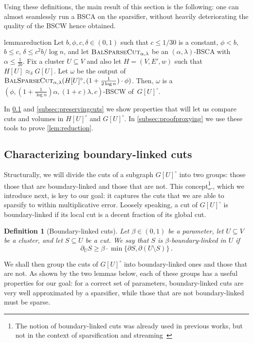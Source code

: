 \documentclass[epsfig,letter,11pt]{article}
\numberwithin{equation}{section}
\newcommand{\uncut}[2]{{\partial}_{#2} #1}
\newcommand{\uncutg}[1]{{\partial} #1}
\newcommand{\bsc}{\textsc{BalSparseCut}_{\alpha,\lambda}}
\newtheorem{definition}[theorem]{Definition}
\begin{document}
Using these definitions, the main result of this section is the following: one can almost seamlessly run a BSCA on the sparsifier, without heavily deteriorating the quality of the BSCW hence obtained.
\begin{restatable}{lemma}{reduction}
	\label{lem:reduction}
	Let $b, \phi, c,\delta \in (0,1)$ such that $c \leq 1/30$ is a constant, $\phi < b$, $b \le c$, $\delta \le c^2b/ \log n$, and  let $\bsc$ be an $(\alpha,\lambda)$-BSCA with $ \alpha \le \frac{1}{2b}$. Fix a cluster $U \subseteq V$ and also let $H=(V,E',w)$ such that $H[U] \approx_\delta G[U]$. Let $\omega$ be the output of $\bsc(H[U]^\circ, (1+\frac{1}{2\log n}) \cdot \phi)$. Then, $\omega$ is a  $(\phi,(1+\frac{1}{\log n})\alpha,(1+c)\lambda,c)$-BSCW of~$G[U]^\circ$.
\end{restatable}
\noindent
In \cref{subsec:boundlink} and \cref{subsec:preservingcuts}  we show properties that will let us compare cuts and volumes in $H[U]^\circ$ and $G[U]^\circ$. In \cref{subsec:proofproxying} we use these tools to prove \cref{lem:reduction}.

\subsection{Characterizing boundary-linked cuts}
\label{subsec:boundlink}
Structurally, we will divide the cuts of a subgraph $G[U]^\circ$ into two groups: those those that are boundary-linked and those that are not. This concept\footnote{The notion of boundary-linked cuts was already used in previous works, but not in the context of sparsification and streaming~\cite{boundlink,mincutjli}}., which we introduce next, is key to our goal: it captures the cuts that we are able to sparsify to within multiplicative error. Loosely speaking, a cut of $G[U]^\circ$ is boundary-linked if its local cut is a decent fraction of its global cut.

\begin{definition}[Boundary-linked cuts]
	\label{def:boundlinkcuts}
	Let $\beta \in (0,1)$ be a parameter, let $U \subseteq V$ be a cluster, and let $S \subseteq U$ be a cut. We say that $S$ is $\beta$-boundary-linked in $U$ if
	\begin{equation*}
		\uncut{S}{U} \ge \beta \cdot \min\{\uncutg{S}, \uncutg{(U \setminus S)}\} \, .
	\end{equation*}
\end{definition}
\noindent
We shall then group the cuts of $G[U]^\circ$ into boundary-linked ones and those that are not. As shown by the two lemmas below, each of these groups has a useful properties for our goal: for a correct set of parameters, boundary-linked cuts are very well approximated by a sparsifier, while those that are not boundary-linked must be sparse.
\end{document}
